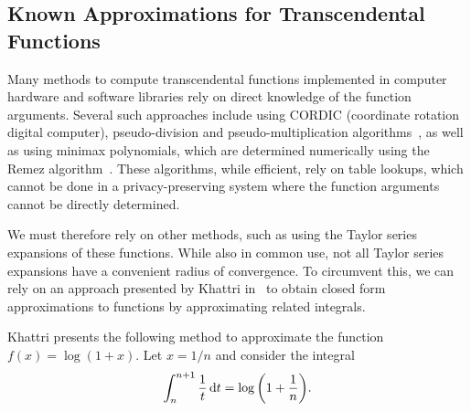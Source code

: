 \subsection{Known Approximations for Transcendental Functions}
Many methods to compute transcendental functions implemented in computer hardware and software libraries rely on direct knowledge of the function arguments. Several such approaches include using CORDIC (coordinate rotation digital computer), pseudo-division and pseudo-multiplication algorithms~\cite{walther_cordic_2000}, as well as using minimax polynomials, which are determined numerically using the Remez algorithm~\cite{harrison_computation_1999}. These algorithms, while efficient, rely on table lookups, which cannot be done in a privacy-preserving system where the function arguments cannot be directly determined.

We must therefore rely on other methods, such as using the Taylor series expansions of these functions. While also in common use, not all Taylor series expansions have a convenient radius of convergence. To circumvent this, we can rely on an approach presented by Khattri in~\cite{khattri_new_2009} to obtain closed form approximations to functions by approximating related integrals.

Khattri presents the following method to approximate the function $f(x)=\log(1+x)$.
Let $x = 1/n$ and consider the integral
\begin{align}
	\label{eq:log_integral}
	\int_{n}^{n+1}{\frac{1}{t}\mathop{}\!\mathrm{d} t}=\log{\left(1+\frac{1}{n}\right)}.
\end{align}

